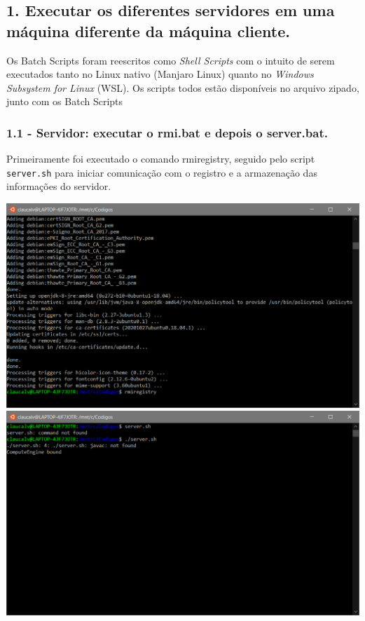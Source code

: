 \subsection*{1. Executar os diferentes servidores em uma máquina diferente da
máquina cliente.}

Os \textit{}{Batch Scripts} foram reescritos como \textit{Shell Scripts} com o intuito de serem executados tanto no Linux nativo (Manjaro Linux) quanto no \textit{Windows Subsystem for Linux} (WSL). Os scripts todos estão disponíveis no arquivo zipado, junto com os Batch Scripts


\subsubsection{1.1 - Servidor: executar o rmi.bat e depois o server.bat.}

Primeiramente foi executado o comando rmiregistry, seguido pelo script \texttt{server.sh} para iniciar comunicação com o registro e a armazenação das informações do servidor.

\vspace{2em}
\begin{minipage}{\textwidth}
    \hspace{-1em}
    \centering
    \includegraphics[scale=.35]{prints/rmiregistry.PNG}
    \hspace{1em}
    \includegraphics[scale=.35]{prints/server.PNG}
    \label{threadspng}
    \hspace{1em}
\end{minipage}
\vspace{0.5em}


